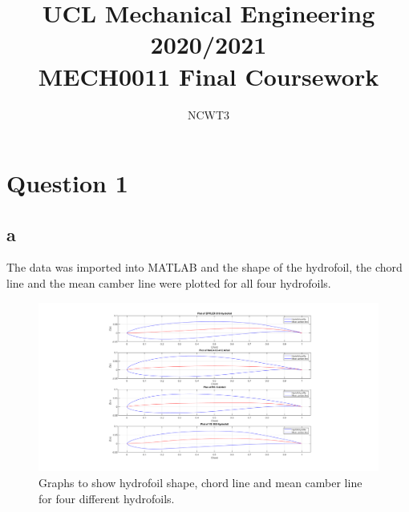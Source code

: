 \documentclass[11pt]{article}
\numberwithin{equation}{section}
\begin{document}
\title{\textbf{UCL Mechanical Engineering 2020/2021}\\MECH0011 Final Coursework}
\author{NCWT3}
\maketitle
\tableofcontents
\listoffigures
\section{Question 1}
\subsection{a}
The data was imported into MATLAB and the shape of the hydrofoil, the chord line and the mean camber line were plotted for all four hydrofoils.

\begin{figure}[H]
    \centering
    \includegraphics[width = \textwidth]{./img/q1a.png}
    \caption{Graphs to show hydrofoil shape, chord line and mean camber line for four different hydrofoils.}
    \label{fig:q1a}
\end{figure}
\end{document}
